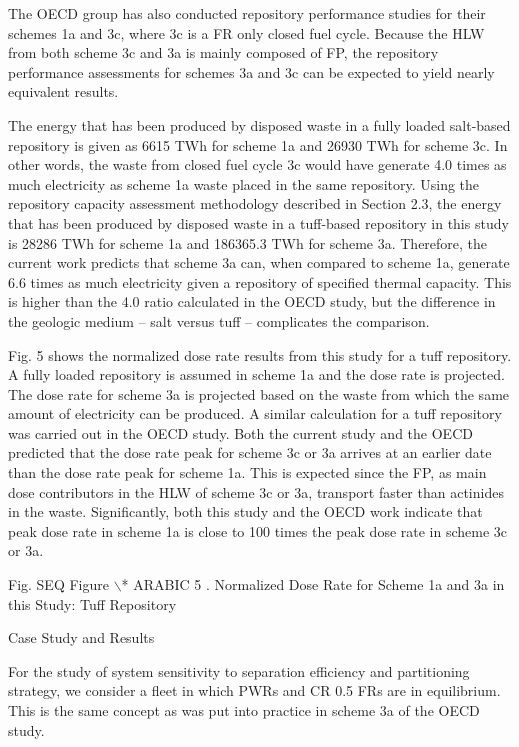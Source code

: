 	The OECD group has also conducted repository performance studies for
their schemes 1a and 3c, where 3c is a FR only closed fuel cycle.
Because the HLW from both scheme 3c and 3a is mainly composed of FP, the
repository performance assessments for schemes 3a and 3c can be expected
to yield nearly equivalent results. 

	The energy that has been produced by disposed waste in a fully loaded
salt-based repository is given as 6615 TWh for scheme 1a and 26930 TWh
for scheme 3c.  In other words, the waste from closed fuel cycle 3c
would have generate 4.0 times as much electricity as scheme 1a waste
placed in the same repository.  Using the repository capacity assessment
methodology described in Section 2.3, the energy that has been produced
by disposed waste in a tuff-based repository in this study is 28286 TWh
for scheme 1a and 186365.3 TWh for scheme 3a. Therefore, the current
work predicts that scheme 3a can, when compared to scheme 1a, generate
6.6 times as much electricity given a repository of specified thermal
capacity. This is higher than the 4.0 ratio calculated in the OECD
study, but the difference in the geologic medium -- salt versus tuff --
complicates the comparison.

	Fig. 5 shows the normalized dose rate results from this study for a
tuff repository. A fully loaded repository is assumed in scheme 1a and
the dose rate is projected. The dose rate for scheme 3a is projected
based on the waste from which the same amount of electricity can be
produced.  A similar calculation for a tuff repository was carried out
in the OECD study.  Both the current study and the OECD predicted that
the dose rate peak for scheme 3c or 3a arrives at an earlier date than
the dose rate peak for scheme 1a.  This is expected since the FP, as
main dose contributors in the HLW of scheme 3c or 3a, transport faster
than actinides in the waste.   Significantly, both this study and the
OECD work indicate that peak dose rate in scheme 1a is close to 100
times the peak dose rate in scheme 3c or 3a.

Fig.   SEQ Figure $\backslash$* ARABIC  5 .  Normalized Dose Rate for
Scheme 1a and 3a in this Study: Tuff Repository

Case Study and Results

	For the study of system sensitivity to separation efficiency and
partitioning strategy, we consider a fleet in which PWRs and CR 0.5 FRs
are in equilibrium.  This is the same concept as was put into practice
in scheme 3a of the OECD study.

